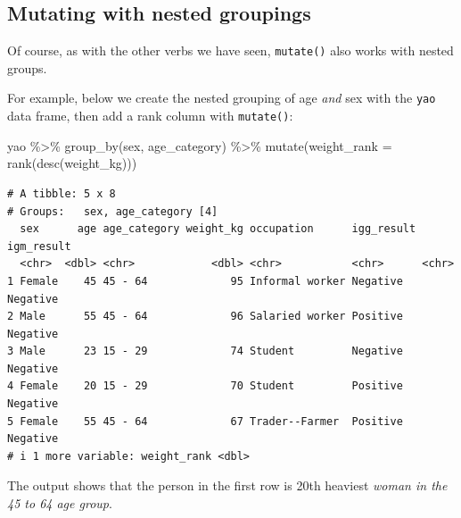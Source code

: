 \documentclass[
  letterpaper,
  DIV=11,
  numbers=noendperiod]{scrreprt}
\newenvironment{Shaded}{\begin{snugshade}}{\end{snugshade}}
\newcommand{\AttributeTok}[1]{\textcolor[rgb]{0.40,0.45,0.13}{#1}}
\newcommand{\FunctionTok}[1]{\textcolor[rgb]{0.28,0.35,0.67}{#1}}
\newcommand{\NormalTok}[1]{\textcolor[rgb]{0.00,0.23,0.31}{#1}}
\newcommand{\SpecialCharTok}[1]{\textcolor[rgb]{0.37,0.37,0.37}{#1}}
\begin{document}
\subsection*{Mutating with nested
groupings}\label{mutating-with-nested-groupings}

Of course, as with the other verbs we have seen, \texttt{mutate()} also
works with nested groups.

For example, below we create the nested grouping of age \emph{and} sex
with the \texttt{yao} data frame, then add a rank column with
\texttt{mutate()}:

\begin{Shaded}
\begin{Highlighting}[]
\NormalTok{yao }\SpecialCharTok{\%\textgreater{}\%} 
  \FunctionTok{group\_by}\NormalTok{(sex, age\_category) }\SpecialCharTok{\%\textgreater{}\%} 
  \FunctionTok{mutate}\NormalTok{(}\AttributeTok{weight\_rank =} \FunctionTok{rank}\NormalTok{(}\FunctionTok{desc}\NormalTok{(weight\_kg)))}
\end{Highlighting}
\end{Shaded}

\begin{verbatim}
# A tibble: 5 x 8
# Groups:   sex, age_category [4]
  sex      age age_category weight_kg occupation      igg_result igm_result
  <chr>  <dbl> <chr>            <dbl> <chr>           <chr>      <chr>     
1 Female    45 45 - 64             95 Informal worker Negative   Negative  
2 Male      55 45 - 64             96 Salaried worker Positive   Negative  
3 Male      23 15 - 29             74 Student         Negative   Negative  
4 Female    20 15 - 29             70 Student         Positive   Negative  
5 Female    55 45 - 64             67 Trader--Farmer  Positive   Negative  
# i 1 more variable: weight_rank <dbl>
\end{verbatim}

The output shows that the person in the first row is 20th heaviest
\emph{woman in the 45 to 64 age group}.
\end{document}
